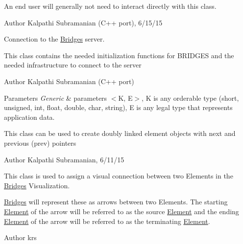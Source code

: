 An end user will generally not need to interact directly with this class.

\begin{DoxyAuthor}{Author}
Kalpathi Subramanian (C++ port), 6/15/15
\end{DoxyAuthor}
Connection to the \hyperlink{classbridges_1_1_bridges}{Bridges} server.

This class contains the needed initialization functions for B\+R\+I\+D\+G\+E\+S and the needed infrastructure to connect to the server

\begin{DoxyAuthor}{Author}
Kalpathi Subramanian (C++ port)
\end{DoxyAuthor}

\begin{DoxyParams}{Parameters}
{\em Generic} & parameters $<$K, E$>$, K is any orderable type (short, unsigned, int, float, double, char, string), E is any legal type that represents application data.\\
\hline
\end{DoxyParams}
This class can be used to create doubly linked element objects with next and previous (prev) pointers

\begin{DoxyAuthor}{Author}
Kalpathi Subramanian, 6/11/15
\end{DoxyAuthor}
This class is used to assign a visual connection between two Elements in the \hyperlink{classbridges_1_1_bridges}{Bridges} Visualization. 

\hyperlink{classbridges_1_1_bridges}{Bridges} will represent these as arrows between two Elements. The starting \hyperlink{classbridges_1_1_element}{Element} of the arrow will be referred to as the source \hyperlink{classbridges_1_1_element}{Element} and the ending \hyperlink{classbridges_1_1_element}{Element} of the arrow will be referred to as the terminating \hyperlink{classbridges_1_1_element}{Element}.

\begin{DoxyAuthor}{Author}
krs
\end{DoxyAuthor}

